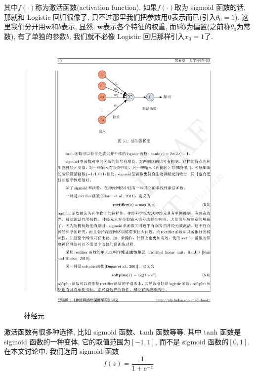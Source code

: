 \documentclass[a4paper,UTF8]{ctexart}
\theoremstyle{plain} \newtheorem{theorem}{定理}[section]
\theoremstyle{plain} \newtheorem{definition}{定义}[section]
\theoremstyle{plain} \newtheorem{lemma}{引理}[section]
\theoremstyle{plain} \newtheorem{proposition}{命题}[section]
\theoremstyle{plain} \newtheorem{example}{例}[section]
\theoremstyle{plain} \newtheorem{remark}{注}[section]
\theoremstyle{plain} \newtheorem{corollary}{推论}[section]
\begin{document}
其中$f(\cdot)$称为激活函数(activation function), 如果$f(\cdot)$取为 sigmoid 函数的话, 那就和 Logistic 回归很像了, 只不过那里我们把参数用$\bm{\theta}$表示而已(引入$\theta_0 = 1$). 这里我们分开用$\bm{w}$和$b$表示, 显然, $\bm{w}$表示各个特征的权重, 而$b$称为偏置(之前称$\theta_0$为常数), 有了单独的参数$b$, 我们就不必像 Logistic 回归那样引入$x_{0} = 1$了.
\begin{figure}[!htb]
  \centering
  \includegraphics[width = 0.85 \textwidth]{neuron.pdf}
  \caption{神经元}
  \label{neuron}
\end{figure}


激活函数有很多种选择, 比如 sigmoid 函数、tanh 函数等等. 其中 tanh 函数是 sigmoid 函数的一种变体, 它的取值范围为$[-1,1]$, 而不是 sigmoid 函数的$[0,1]$. 在本文讨论中, 我们选用 sigmoid 函数
\begin{equation*}
f(z) = \frac{1}{1 + \mathrm{e}^{-z}}
\end{equation*}
\end{document}
